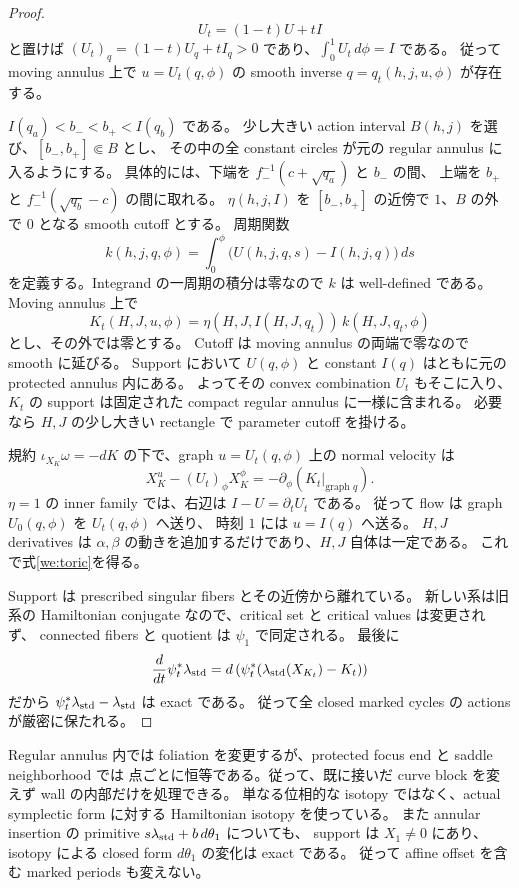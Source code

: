 \begin{proof}
\[
 U_t=(1-t)U+tI
\]
と置けば $(U_t)_q=(1-t)U_q+tI_q>0$ であり、$\int_0^1U_t\,d\phi=I$ である。
従って moving annulus 上で $u=U_t(q,\phi)$ の smooth inverse
$q=q_t(h,j,u,\phi)$ が存在する。

$I(q_a)<b_-<b_+<I(q_b)$ である。
少し大きい action interval $B(h,j)$ を選び、$[b_-,b_+]\Subset B$ とし、
その中の全 constant circles が元の regular annulus に入るようにする。
具体的には、下端を $f_-^{-1}(c+\sqrt{q_a})$ と $b_-$ の間、
上端を $b_+$ と $f_-^{-1}(\sqrt{q_b}-c)$ の間に取れる。
$\eta(h,j,I)$ を $[b_-,b_+]$ の近傍で $1$、$B$ の外で $0$ となる smooth cutoff とする。
周期関数
\[
 k(h,j,q,\phi)=\int_0^\phi
 \bigl(U(h,j,q,s)-I(h,j,q)\bigr)\,ds
\]
を定義する。Integrand の一周期の積分は零なので $k$ は well-defined である。
Moving annulus 上で
\begin{equation}\label{we:hamiltonian}
 K_t(H,J,u,\phi)=
 \eta(H,J,I(H,J,q_t))\,k(H,J,q_t,\phi)
\end{equation}
とし、その外では零とする。
Cutoff は moving annulus の両端で零なので smooth に延びる。
Support において $U(q,\phi)$ と constant $I(q)$ はともに元の protected annulus 内にある。
よってその convex combination $U_t$ もそこに入り、
$K_t$ の support は固定された compact regular annulus に一様に含まれる。
必要なら $H,J$ の少し大きい rectangle で parameter cutoff を掛ける。

規約 $\iota_{X_K}\omega=-dK$ の下で、graph $u=U_t(q,\phi)$ 上の normal velocity は
\[
 X_K^u-(U_t)_\phi X_K^\phi
 =-\partial_\phi(K_t|_{\text{graph }q}).
\]
$\eta=1$ の inner family では、右辺は $I-U=\partial_tU_t$ である。
従って flow は graph $U_0(q,\phi)$ を $U_t(q,\phi)$ へ送り、
時刻 $1$ には $u=I(q)$ へ送る。
$H,J$ derivatives は $\alpha,\beta$ の動きを追加するだけであり、$H,J$ 自体は一定である。
これで式\eqref{we:toric}を得る。

Support は prescribed singular fibers とその近傍から離れている。
新しい系は旧系の Hamiltonian conjugate なので、critical set と critical values は変更されず、
connected fibers と quotient は $\psi_1$ で同定される。
最後に
\[
 \frac{d}{dt}\psi_t^*\lambda_{\rm std}
 =d\left(\psi_t^*(\lambda_{\rm std}(X_{K_t})-K_t)\right)
\]
だから $\psi_t^*\lambda_{\rm std}-\lambda_{\rm std}$ は exact である。
従って全 closed marked cycles の actions が厳密に保たれる。
\end{proof}

\begin{remark}
Regular annulus 内では foliation を変更するが、protected focus end と saddle neighborhood では
点ごとに恒等である。従って、既に接いだ curve block を変えず wall の内部だけを処理できる。
単なる位相的な isotopy ではなく、actual symplectic form に対する Hamiltonian isotopy を使っている。
また annular insertion の primitive $s\lambda_{\rm std}+b\,d\theta_1$ についても、
support は $X_1\ne0$ にあり、isotopy による closed form $d\theta_1$ の変化は exact である。
従って affine offset を含む marked periods も変えない。
\end{remark}


